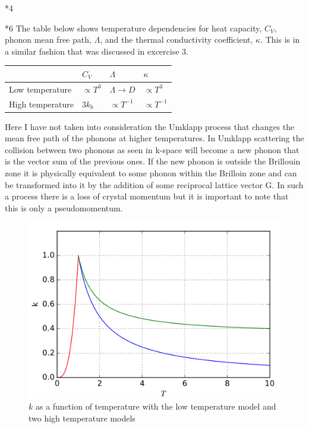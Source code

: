 \documentclass[a4paper]{article}
\begin{document}
\begin{section}
\begin{section}*{4}
	


\end{section}

\begin{section}*6
	The table below shows temperature dependencies for heat capacity, $C_V$, phonon mean free path, $\Lambda$, and the thermal conductivity coefficient, $\kappa$. This is in a similar fashion that was discussed in excercise 3.\newline
	\begin{center}
	\begin{tabular}{ | l | l | l | l | }
		\hline
		 & $C_V$ & $\Lambda$ & $\kappa$ \\ \hline
		Low temperature & $\propto T^3$ & $\Lambda \rightarrow D$ & $\propto T^3$ \\ \hline
		High temperature & $3k_b$ & $\propto T^{-1}$ & $\propto T^{-1}$\\
		\hline
	\end{tabular}
	\end{center}
	Here I have not taken into consideration the Umklapp process that changes the mean free path of the phonons at higher temperatures. In  Umklapp scattering the collision between two phonons as seen in k-space will become a new phonon that is the vector sum of the previous ones. If the new phonon is outside the Brillouin zone it is physically equivalent to some phonon within the Brilloin zone and can be transformed into it by the addition of some reciprocal lattice vector G. In such a process there is a loss of crystal momentum but it is important to note that this is only a pseudomomentum.
	\begin{figure}[H]
		\includegraphics[width = 0.8\linewidth]{kappa.png}
		\centering
		\caption{$k$ as a function of temperature with the low temperature model and two high temperature models}
	\end{figure}
\end{section}

\end{section}
\end{document}
